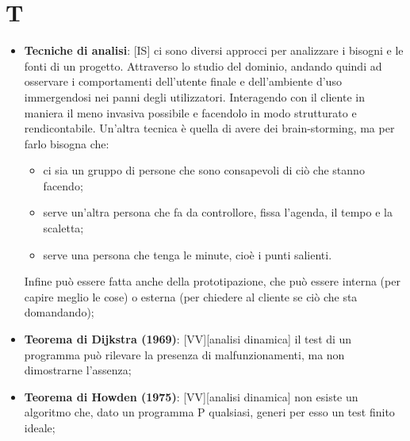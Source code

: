 %
%
%

\section{T} %
\label{sec:t}
	\begin{itemize}
		\item \textbf{Tecniche di analisi}: [IS] ci sono diversi approcci per analizzare i bisogni e le fonti di un progetto. Attraverso lo studio del dominio, andando quindi ad osservare i comportamenti dell'utente finale e dell'ambiente d'uso immergendosi nei panni degli utilizzatori. Interagendo con il cliente in maniera il meno invasiva possibile e facendolo in modo strutturato e rendicontabile. Un'altra tecnica è quella di avere dei brain-storming, ma per farlo bisogna che:
			\begin{itemize}
				\item ci sia un gruppo di persone che sono consapevoli di ciò che stanno facendo;
				\item serve un'altra persona che fa da controllore, fissa l'agenda, il tempo e la scaletta;
				\item serve una persona che tenga le minute, cioè i punti salienti.
			\end{itemize}
		\noindent
		Infine può essere fatta anche della prototipazione, che può essere interna (per capire meglio le cose) o esterna (per chiedere al cliente se ciò che sta domandando);

		\item \textbf{Teorema di Dijkstra (1969)}: [VV][analisi dinamica] il test di un programma può rilevare la presenza di malfunzionamenti, ma non dimostrarne l'assenza;

		\item \textbf{Teorema di Howden (1975)}: [VV][analisi dinamica] non esiste un algoritmo che, dato un programma P qualsiasi, generi per esso un test finito ideale;


\end{itemize}
